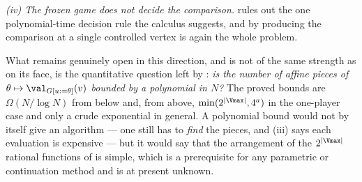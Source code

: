 \begin{remark}
\emph{(iv) The frozen game does not decide the comparison.}
 rules out the one polynomial-time decision rule the
calculus suggests, and by  producing the
comparison at a single controlled vertex is again the whole problem.

What remains genuinely open in this direction, and is not of the same
strength as  on its face, is the quantitative question
left by : \emph{is the number of affine pieces of
$\theta\mapsto\val_{G[u:=\theta]}(v)$ bounded by a polynomial in $N$?}
The proved bounds are $\Omega(N/\log N)$ from below and, from above,
$\min(2^{|\Vmax|},4^{a})$ in the one-player case and only a crude
exponential in general. A polynomial bound would
not by itself give an algorithm --- one still has to \emph{find} the
pieces, and (iii) says each evaluation is expensive --- but it would say
that the arrangement of the $2^{|\Vmax|}$ rational functions of
 is simple, which is a prerequisite for any
parametric or continuation method and is at present unknown.
\end{remark}

